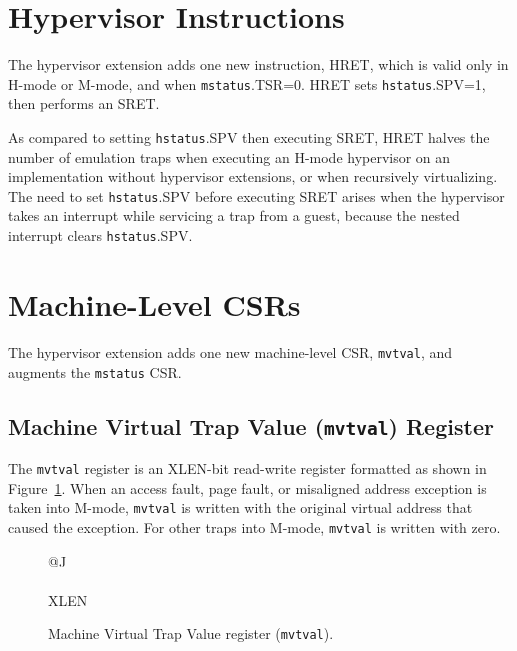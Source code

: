 \section{Hypervisor Instructions}

The hypervisor extension adds one new instruction, HRET, which is valid only in
H-mode or M-mode, and when {\tt mstatus}.TSR=0.  HRET sets {\tt hstatus}.SPV=1,
then performs an SRET.

\begin{commentary}
As compared to setting {\tt hstatus}.SPV then executing SRET, HRET halves the
number of emulation traps when executing an H-mode hypervisor on an
implementation without hypervisor extensions, or when recursively
virtualizing.  The need to set {\tt hstatus}.SPV before executing SRET arises
when the hypervisor takes an interrupt while servicing a trap from a guest,
because the nested interrupt clears {\tt hstatus}.SPV.
\end{commentary}

\section{Machine-Level CSRs}

The hypervisor extension adds one new machine-level CSR, {\tt mvtval}, and
augments the {\tt mstatus} CSR.

\subsection{Machine Virtual Trap Value ({\tt mvtval}) Register}

The {\tt mvtval} register is an XLEN-bit read-write register formatted as shown
in Figure~\ref{mvtvalreg}.  When an access fault, page fault, or misaligned
address exception is taken into M-mode, {\tt mvtval} is
written with the original virtual address that caused the exception.
For other traps into M-mode, {\tt mvtval} is written with zero.

\begin{figure}[h!]
{\footnotesize
\begin{center}
\begin{tabular}{@{}J}
 \\
\hline
{} \\
\hline
XLEN \\
\end{tabular}
\end{center}
}
\vspace{-0.1in}
\caption{Machine Virtual Trap Value register ({\tt mvtval}).}
\label{mvtvalreg}
\end{figure}

